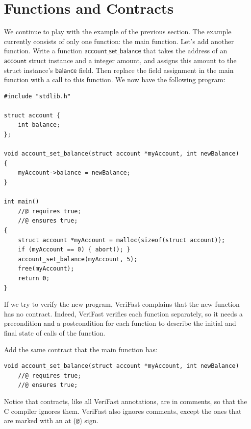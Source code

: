\documentclass{article}
\begin{document}
\section{Functions and Contracts}

We continue to play with the example of the previous section.
The example currently consists of only one function: the main
function. Let's add another function. Write a function
$\mathsf{account\_set\_balance}$ that takes the address of an
$\mathsf{account}$ struct instance and a integer amount, and
assigns this amount to the struct instance's $\mathsf{balance}$
field. Then replace the field assignment in the main function
with a call to this function. We now have the following
program:

\begin{lstlisting}
#include "stdlib.h"

struct account {
    int balance;
};

void account_set_balance(struct account *myAccount, int newBalance)
{
    myAccount->balance = newBalance;
}

int main()
    //@ requires true;
    //@ ensures true;
{
    struct account *myAccount = malloc(sizeof(struct account));
    if (myAccount == 0) { abort(); }
    account_set_balance(myAccount, 5);
    free(myAccount);
    return 0;
}
\end{lstlisting}

If we try to verify the new program, VeriFast complains that
the new function has no contract. Indeed, VeriFast verifies
each function separately, so it needs a precondition and a
postcondition for each function to describe the initial and
final state of calls of the function.

Add the same contract that the main function has:
\begin{lstlisting}
void account_set_balance(struct account *myAccount, int newBalance)
    //@ requires true;
    //@ ensures true;
\end{lstlisting}
Notice that contracts, like all VeriFast annotations, are in
comments, so that the C compiler ignores them. VeriFast also
ignores comments, except the ones that are marked with an at
(\verb|@|) sign.
\end{document}
